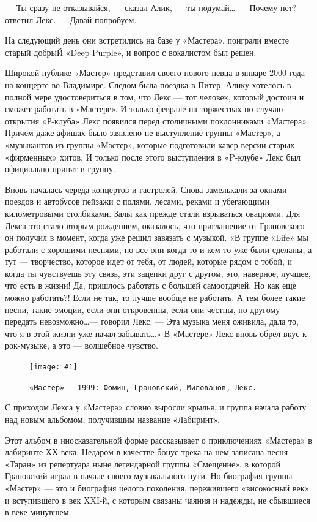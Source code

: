 \documentclass[16pt,a5paper]{book}
\newcommand{\myincludegraphics}[1]{\texttt{[image: \#1]}}
\begin{document}
— Ты сразу не отказывайся, — сказал Алик, — ты подумай\ldots
— Почему нет? — ответил Лекс. — Давай попробуем.

На следующий день они встретились на базе у «Мастера», поиграли вместе старый добрыЙ «Deep Purple», и вопрос с
вокалистом был решен.

Широкой публике «Мастер» представил своего нового певца в январе 2000 года на концерте во Владимире. Следом была поездка
в Питер. Алику хотелось в полной мере удостовериться в том, что Лекс — тот человек, который достоин и сможет работать в
«Мастере». И только феврале на торжествах по случаю открытия «Р-клуба» Лекс появился перед столичными поклонниками
«Мастера». Причем даже афишах было заявлено не выступление группы «Мастер», а «музыкантов из группы «Мастер», которые
подготовили кавер-версии старых «фирменных» хитов. И только после этого выступления в «P-клубе» Лекс был официально
принят в группу.

Вновь началась череда концертов и гастролей. Снова замелькали за окнами поездов и автобусов пейзажи с полями, лесами,
реками и убегающими километровыми столбиками. Залы как прежде стали взрываться овациями. Для Лекса это стало вторым
рождением, оказалось, что приглашение от Грановского он получил в момент, когда уже решил завязать с музыкой. «В группе
«Life» мы работали с хорошими песнями, но все они когда-то и кем-то уже были сделаны, а тут — творчество, которое идет
от тебя, от людей, которые рядом с тобой, и когда ты чувствуешь эту связь, эти зацепки друг с другом, это, наверное,
лучшее, что есть в жизни! Да, пришлось работать с большей самоотдачей. Но как еще можно работать?! Если не так, то лучше
вообще не работать. А тем более такие песни, такие эмоции, если они откровенны, если они честны, по-другому передать
невозможно\ldots — говорил Лекс. — Эта музыка меня оживила, дала то, что я в этой жизни уже начал забывать\ldots» В
«Мастере» Лекс вновь обрел вкус к рок-музыке, а это — волшебное чувство.

\begin{figure}[h]
    \centering
    \myincludegraphics{Image33}
    \caption{\texttt{«Мастер» - 1999: Фомин, Грановский, Милованов, Лекс.}}
\end{figure}

С приходом Лекса у «Мастера» словно выросли крылья, и группа начала работу над новым альбомом, получившим название
«Лабиринт».

Этот альбом в иносказательной форме рассказывает о приключениях «Мастера» в лабиринте ХХ века. Недаром в качестве
бонус-трека на нем записана песня «Таран» из репертуара ныне легендарной группы «Смещение», в которой Грановский играл в
начале своего музыкального пути. Но биография группы «Мастер» — это и биография целого поколения, пережившего
«високосный век» и вступившего в век XXI-й, с которым связаны чаяния и надежды, не сбывшиеся в веке минувшем.
\end{document}
